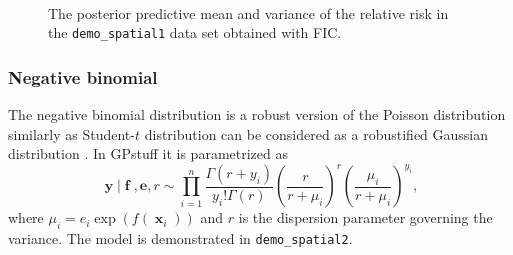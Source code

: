 \documentclass[twoside,11pt]{article}
\DeclareMathOperator{\x}{\mathbf{x}}
\DeclareMathOperator{\f}{\mathbf{f}}
\DeclareMathOperator{\y}{\mathbf{y}}
\newcommand{\mb}{\mathbf}
\newcommand{\pkg}[1]{{\fontseries{b}\selectfont #1}}
\newcommand{\code}[1]{{\normalfont\texttt{#1}}}
\begin{document}
\begin{figure}[]
  \begin{center}
    ~
    \caption[]{The posterior predictive mean and variance of the
      relative risk in the \code{demo\_spatial1} data set obtained
      with FIC.}\label{demo_spatial1_fig1}
  \end{center}
\end{figure}

\subsubsection{Negative binomial}\label{sec_spatial_demo2}

The negative binomial distribution is a robust version of the Poisson
distribution similarly as Student-$t$ distribution can be considered
as a robustified Gaussian distribution
\citep{Gelman+etal+BDA3:2013}. In \pkg{GPstuff} it is
parametrized as
%
\begin{equation}
 \y |\f,\mb{e}, r  \sim \prod_{i=1}^n
 \frac{\Gamma(r+y_i)}{y_i!\Gamma(r)}
\left(\frac{r}{r+\mu_i}\right)^r \left(\frac{\mu_i}{r+\mu_i}\right)^{y_i},
\end{equation}
%
where $\mu_i = e_i\exp(f(\x_i))$ and $r$ is the dispersion parameter
governing the variance. The model is demonstrated in
\code{demo\_spatial2}.
\end{document}
